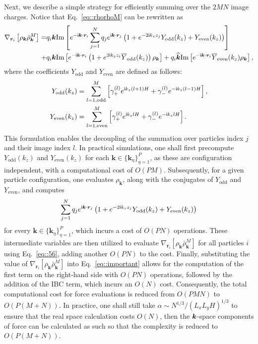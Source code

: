 Next, we describe a simple strategy for efficiently summing over the $2MN$ image charges.
Notice that Eq.~\eqref{eq::rhorhoM} can be rewritten as
\begin{equation}\label{eq::56}
\begin{split}
    \nabla_{\bm{r}_i}\left[\rho_{\bm{k}}\bar{\rho}_{\bm{k}}^{M}\right]
    = & q_i\bm{k}\text{Im}\left[e^{-\mathsf i \bm{k}\cdot \bm{r}_i}\sum_{j=1}^{N}q_je^{\mathsf i\bm{k}\cdot\bm{r}_{j}}\left(1+e^{-2\mathsf i k_zz_j}Y_{\text{odd}}(k_z)+Y_{\text{even}}(k_z)\right)\right]\\
    + & q_i\bm{k}\text{Im}\left[e^{-\mathsf i \bm{k}\cdot\bm{r}_i}\left(1+e^{2\mathsf i k_zz_i}\overline{Y}_{\text{odd}}(k_z)\right)\rho_{\bm{k}}\right]+q_{i}\widehat{\bm{k}}\text{Im}\left[e^{-\mathsf i\bm{k}\cdot\bm{r}_i}\overline{Y}_{\text{even}}(k_z)\rho_{\bm{k}}\right],
\end{split}
\end{equation}
 {where the coefficients $Y_{\text{odd}}$ and $Y_{\text{even}}$ are defined as follows: 
\begin{equation}
    \begin{split}
        Y_{\text{odd}}(k_z) &= \sum_{\substack{l=1, \text{odd}}}^{M}\left[\gamma_{+}^{(l)}e^{\mathsf i k_z(l+1) H}+\gamma_{-}^{(l)}e^{-\mathsf i k_z (l-1)H}\right], \\ 
        Y_{\text{even}}(k_z) &= \sum_{\substack{l=1, \text{even}}}^{M}\left[\gamma_{+}^{(l)}e^{\mathsf i k_zl H}+\gamma_{-}^{(l)}e^{-\mathsf i k_z l H}\right].
    \end{split}
\end{equation}
This formulation enables the decoupling of the summation over particles index $j$ and their image index $l$. 
In practical simulations, one shall first precompute $Y_{\text{odd}}(k_z)$ and $Y_{\text{even}}(k_z)$ for each $\bm{k} \in \{\bm{k}_{\eta}\}_{\eta=1}^{P}$, as these are configuration independent, with a computational cost of $O(PM)$. 
Subsequently, for a given particle configuration, one evaluates $\rho_{\bm{k}}$, along with the conjugates of $Y_{\text{odd}}$ and $Y_{\text{even}}$, and computes
\begin{equation}
    \sum_{j=1}^{N}q_je^{\mathsf i\bm{k}\cdot\bm{r}_{j}}\left(1+e^{-2\mathsf i k_zz_j}Y_{\text{odd}}(k_z)+Y_{\text{even}}(k_z)\right)
\end{equation}
for every $\bm{k}\in\{\bm{k}_{\eta}\}_{\eta=1}^{P}$, which incurs a cost of $O(PN)$ operations. These intermediate variables are then utilized to evaluate $\nabla_{\bm{r}_i}\left[\rho_{\bm{k}}\bar{\rho}_{\bm{k}}^{M}\right]$ for all particles $i$ using Eq.~\eqref{eq::56}, adding another $O(PN)$ to the cost. Finally, substituting the value of $\nabla_{\bm{r}_i}\left[\rho_{\bm{k}}\bar{\rho}_{\bm{k}}^{M}\right]$ into Eq.~\eqref{eq::important} allows for the computation of the first term on the right-hand side with $O(PN)$ operations, followed by the addition of the IBC term, which incurs an $O(N)$ cost. Consequently, the total computational cost for force evaluations is reduced from $O(PMN)$ to $O(P(M+N))$.
In practice, one shall still take $\alpha \sim N^{1/3}/(L_xL_yH)^{1/3}$ to ensure that the real space calculation costs $O(N)$, then the $\boldsymbol{k}$-space components of force can be calculated as such so that the complexity is reduced to $O(P(M+N))$.}
